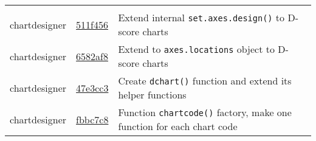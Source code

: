 \documentclass[]{book}
\begin{document}
\begin{longtable}[]{@{}lll@{}}
\begin{minipage}[t]{0.36\columnwidth}
\end{minipage}\tabularnewline
\begin{minipage}[t]{0.26\columnwidth}\raggedright
chartdesigner\strut
\end{minipage} & \begin{minipage}[t]{0.29\columnwidth}\raggedright
\href{https://github.com/stefvanbuuren/chartdesigner/commit/511f456884bc62d6bebc9b5ef33cebb940dc126d}{511f456}\strut
\end{minipage} & \begin{minipage}[t]{0.36\columnwidth}\raggedright
Extend internal \texttt{set.axes.design()} to D-score charts\strut
\end{minipage}\tabularnewline
\begin{minipage}[t]{0.26\columnwidth}\raggedright
chartdesigner\strut
\end{minipage} & \begin{minipage}[t]{0.29\columnwidth}\raggedright
\href{https://github.com/stefvanbuuren/chartdesigner/commit/6582af8753331a25d8970683d4523c69d6959f0d}{6582af8}\strut
\end{minipage} & \begin{minipage}[t]{0.36\columnwidth}\raggedright
Extend to \texttt{axes.locations} object to D-score charts\strut
\end{minipage}\tabularnewline
\begin{minipage}[t]{0.26\columnwidth}\raggedright
chartdesigner\strut
\end{minipage} & \begin{minipage}[t]{0.29\columnwidth}\raggedright
\href{https://github.com/stefvanbuuren/chartdesigner/commit/47e3cc39d1253a41d3cc81d3d6dd55bffa842f18}{47e3cc3}\strut
\end{minipage} & \begin{minipage}[t]{0.36\columnwidth}\raggedright
Create \texttt{dchart()} function and extend its helper functions\strut
\end{minipage}\tabularnewline
\begin{minipage}[t]{0.26\columnwidth}\raggedright
chartdesigner\strut
\end{minipage} & \begin{minipage}[t]{0.29\columnwidth}\raggedright
\href{https://github.com/stefvanbuuren/chartdesigner/commit/fbbc7c8647ea010b2292fa9dd9b253ce95b6a54b}{fbbc7c8}\strut
\end{minipage} & \begin{minipage}[t]{0.36\columnwidth}\raggedright
Function \texttt{chartcode()} factory, make one function for each chart code\strut

\end{minipage}
\end{longtable}
\end{document}
